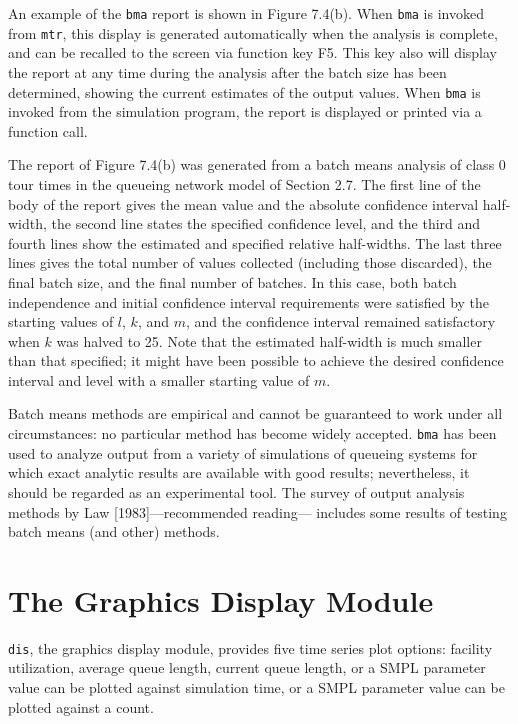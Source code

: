 An example of the \texttt{bma} report is shown in Figure 7.4(b). When \texttt{bma} is
invoked from \texttt{mtr}, this display is generated automatically when the analysis
is complete, and can be recalled to the screen via function key F5. This
key also will display the report at any time during the analysis after the
batch size has been determined, showing the current estimates of the output
values. When \texttt{bma} is invoked from the simulation program, the report is
displayed or printed via a function call.

The report of Figure 7.4(b) was generated from a batch means analysis of
class 0 tour times in the queueing network model of Section 2.7. The first line
of the body of the report gives the mean value and the absolute confidence
interval half-width, the second line states the specified confidence level,
and the third and fourth lines show the estimated and specified relative
half-widths. The last three lines gives the total number of values collected
(including those discarded), the final batch size, and the final number of
batches. In this case, both batch independence and initial confidence interval
requirements were satisfied by the starting values of $l$, $k$, and $m$, and the
confidence interval remained satisfactory when $k$ was halved to 25. Note
that the estimated half-width is much smaller than that specified; it
might have been possible to achieve the desired confidence interval and
level with a smaller starting value of $m$.

Batch means methods are empirical and cannot be guaranteed to work
under all circumstances: no particular method has become widely accepted.
\texttt{bma} has been used to analyze output from a variety of simulations of
queueing systems for which exact analytic results are available with good
results; nevertheless, it should be regarded as an experimental tool. The
survey of output analysis methods by Law [1983]---recommended reading---
includes some results of testing batch means (and other) methods.

\section{The Graphics Display Module}
\label{sec:simenv-dis}

\texttt{dis}, the graphics display module, provides five time series plot options:
facility utilization, average queue length, current queue length, or a SMPL
parameter value can be plotted against simulation time, or a SMPL parameter
value can be plotted against a count.

